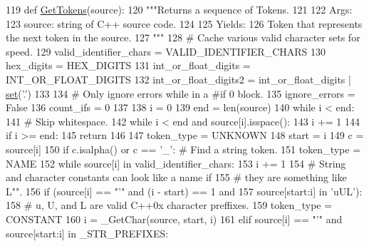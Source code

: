 \begin{DoxyCode}
119 \textcolor{keyword}{def }\hyperlink{namespacecpp_1_1tokenize_ab78959b4d0a9c3bade98904a23129afc}{GetTokens}(source):
120     \textcolor{stringliteral}{"""Returns a sequence of Tokens.}
121 \textcolor{stringliteral}{}
122 \textcolor{stringliteral}{    Args:}
123 \textcolor{stringliteral}{      source: string of C++ source code.}
124 \textcolor{stringliteral}{}
125 \textcolor{stringliteral}{    Yields:}
126 \textcolor{stringliteral}{      Token that represents the next token in the source.}
127 \textcolor{stringliteral}{    """}
128     \textcolor{comment}{# Cache various valid character sets for speed.}
129     valid\_identifier\_chars = VALID\_IDENTIFIER\_CHARS
130     hex\_digits = HEX\_DIGITS
131     int\_or\_float\_digits = INT\_OR\_FLOAT\_DIGITS
132     int\_or\_float\_digits2 = int\_or\_float\_digits | \hyperlink{namespacecpp_1_1gmock__class_a2157e96eee0b4bf9ca6d195ab76f59c2}{set}(\textcolor{stringliteral}{'.'})
133 
134     \textcolor{comment}{# Only ignore errors while in a #if 0 block.}
135     ignore\_errors = \textcolor{keyword}{False}
136     count\_ifs = 0
137 
138     i = 0
139     end = len(source)
140     \textcolor{keywordflow}{while} i < end:
141         \textcolor{comment}{# Skip whitespace.}
142         \textcolor{keywordflow}{while} i < end \textcolor{keywordflow}{and} source[i].isspace():
143             i += 1
144         \textcolor{keywordflow}{if} i >= end:
145             \textcolor{keywordflow}{return}
146 
147         token\_type = UNKNOWN
148         start = i
149         c = source[i]
150         \textcolor{keywordflow}{if} c.isalpha() \textcolor{keywordflow}{or} c == \textcolor{stringliteral}{'\_'}:              \textcolor{comment}{# Find a string token.}
151             token\_type = NAME
152             \textcolor{keywordflow}{while} source[i] \textcolor{keywordflow}{in} valid\_identifier\_chars:
153                 i += 1
154             \textcolor{comment}{# String and character constants can look like a name if}
155             \textcolor{comment}{# they are something like L"".}
156             \textcolor{keywordflow}{if} (source[i] == \textcolor{stringliteral}{"'"} \textcolor{keywordflow}{and} (i - start) == 1 \textcolor{keywordflow}{and}
157                 source[start:i] \textcolor{keywordflow}{in} \textcolor{stringliteral}{'uUL'}):
158                 \textcolor{comment}{# u, U, and L are valid C++0x character preffixes.}
159                 token\_type = CONSTANT
160                 i = \_GetChar(source, start, i)
161             \textcolor{keywordflow}{elif} source[i] == \textcolor{stringliteral}{"'"} \textcolor{keywordflow}{and} source[start:i] \textcolor{keywordflow}{in} \_STR\_PREFIXES:

\end{DoxyCode}

